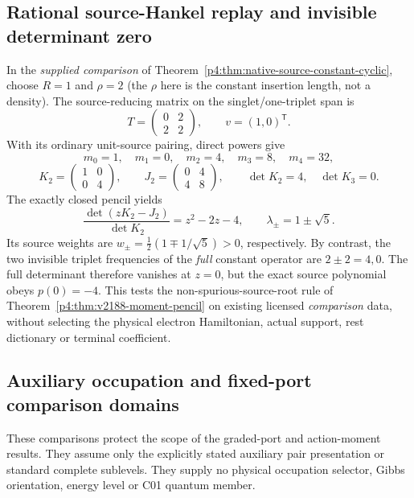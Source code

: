 \documentclass[12pt,a4paper]{article}
\begin{document}


\subsection{Rational source-Hankel replay and invisible determinant zero}
\label{p4:app:v2188-moment-pencil-test}
In the \emph{supplied comparison} of
Theorem~\ref{p4:thm:native-source-constant-cyclic}, choose $R=1$ and
$\rho=2$ (the $\rho$ here is the constant insertion length, not a density).
The source-reducing matrix on the singlet/one-triplet span is
\[
 T=\begin{pmatrix}0&2\\2&2\end{pmatrix},\qquad v=(1,0)^{\mathsf T}.
\]
With its ordinary unit-source pairing, direct powers give
\[
 m_0=1,\quad m_1=0,\quad m_2=4,\quad m_3=8,\quad m_4=32,
\]
\[
 K_2=\begin{pmatrix}1&0\\0&4\end{pmatrix},\qquad
 J_2=\begin{pmatrix}0&4\\4&8\end{pmatrix},\qquad
 \det K_2=4,\quad \det K_3=0.
\]
The exactly closed pencil yields
\[
 \frac{\det(zK_2-J_2)}{\det K_2}=z^2-2z-4,
 \qquad \lambda_\pm=1\pm\sqrt5.
\]
Its source weights are
$w_\pm=\frac12(1\mp1/\sqrt5)>0$, respectively.
By contrast, the two invisible triplet frequencies of the \emph{full}
constant operator are $2\pm2=4,0$. The full determinant therefore
vanishes at $z=0$, but the exact source polynomial obeys $p(0)=-4$.
This tests the non-spurious-source-root rule of
Theorem~\ref{p4:thm:v2188-moment-pencil} on existing licensed
\emph{comparison} data, without selecting the physical electron
Hamiltonian, actual support, rest dictionary or terminal coefficient.






\subsection{Auxiliary occupation and fixed-port comparison domains}
\label{p4:app:v2174-occupation-comparisons}
These comparisons protect the scope of the graded-port and action-moment
results. They assume only the explicitly stated auxiliary pair presentation
or standard complete sublevels. They supply no physical occupation selector,
Gibbs orientation, energy level or C01 quantum member.
\end{document}

